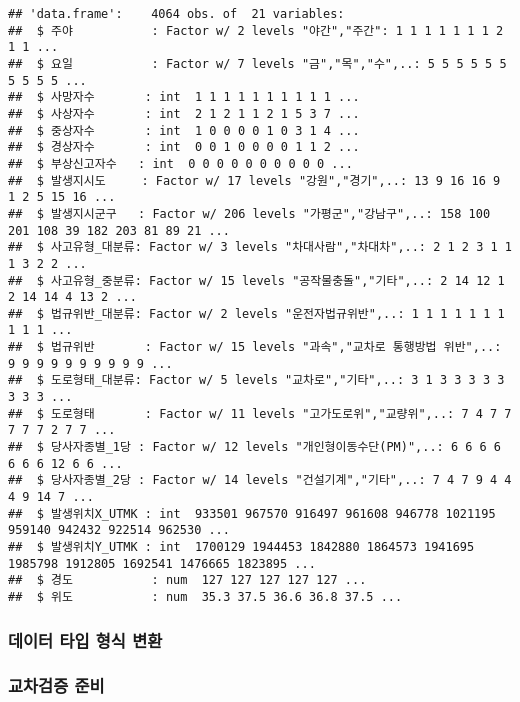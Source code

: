 \documentclass[]{article}
\newenvironment{Shaded}{\begin{snugshade}}{\end{snugshade}}
\newcommand{\KeywordTok}[1]{\textcolor[rgb]{0.13,0.29,0.53}{\textbf{#1}}}
\newcommand{\OperatorTok}[1]{\textcolor[rgb]{0.81,0.36,0.00}{\textbf{#1}}}
\newcommand{\NormalTok}[1]{#1}
\begin{document}
\begin{verbatim}
## 'data.frame':    4064 obs. of  21 variables:
##  $ 주야           : Factor w/ 2 levels "야간","주간": 1 1 1 1 1 1 1 2 1 1 ...
##  $ 요일           : Factor w/ 7 levels "금","목","수",..: 5 5 5 5 5 5 5 5 5 5 ...
##  $ 사망자수       : int  1 1 1 1 1 1 1 1 1 1 ...
##  $ 사상자수       : int  2 1 2 1 1 2 1 5 3 7 ...
##  $ 중상자수       : int  1 0 0 0 0 1 0 3 1 4 ...
##  $ 경상자수       : int  0 0 1 0 0 0 0 1 1 2 ...
##  $ 부상신고자수   : int  0 0 0 0 0 0 0 0 0 0 ...
##  $ 발생지시도     : Factor w/ 17 levels "강원","경기",..: 13 9 16 16 9 1 2 5 15 16 ...
##  $ 발생지시군구   : Factor w/ 206 levels "가평군","강남구",..: 158 100 201 108 39 182 203 81 89 21 ...
##  $ 사고유형_대분류: Factor w/ 3 levels "차대사람","차대차",..: 2 1 2 3 1 1 1 3 2 2 ...
##  $ 사고유형_중분류: Factor w/ 15 levels "공작물충돌","기타",..: 2 14 12 1 2 14 14 4 13 2 ...
##  $ 법규위반_대분류: Factor w/ 2 levels "운전자법규위반",..: 1 1 1 1 1 1 1 1 1 1 ...
##  $ 법규위반       : Factor w/ 15 levels "과속","교차로 통행방법 위반",..: 9 9 9 9 9 9 9 9 9 9 ...
##  $ 도로형태_대분류: Factor w/ 5 levels "교차로","기타",..: 3 1 3 3 3 3 3 3 3 3 ...
##  $ 도로형태       : Factor w/ 11 levels "고가도로위","교량위",..: 7 4 7 7 7 7 7 2 7 7 ...
##  $ 당사자종별_1당 : Factor w/ 12 levels "개인형이동수단(PM)",..: 6 6 6 6 6 6 6 12 6 6 ...
##  $ 당사자종별_2당 : Factor w/ 14 levels "건설기계","기타",..: 7 4 7 9 4 4 4 9 14 7 ...
##  $ 발생위치X_UTMK : int  933501 967570 916497 961608 946778 1021195 959140 942432 922514 962530 ...
##  $ 발생위치Y_UTMK : int  1700129 1944453 1842880 1864573 1941695 1985798 1912805 1692541 1476665 1823895 ...
##  $ 경도           : num  127 127 127 127 127 ...
##  $ 위도           : num  35.3 37.5 36.6 36.8 37.5 ...
\end{verbatim}

\subsubsection{데이터 타입 형식 변환}\label{---}

\begin{Shaded}
\end{Shaded}

\subsubsection{교차검증 준비}\label{-}
\end{document}
